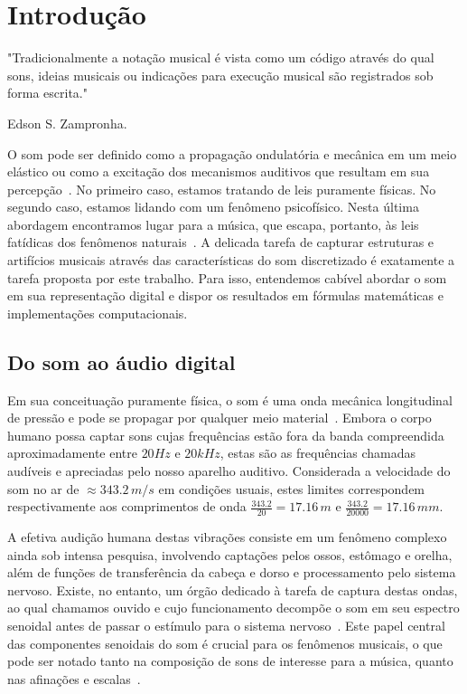 \chapter{Introdução} %
\label{cap:intro} 
\epigraph{"Tradicionalmente a notação musical é vista como um código através do qual sons, ideias musicais ou indicações para execução musical são registrados sob forma escrita."}{Edson S. Zampronha.\cite{Zampronha} \\}


O som pode ser definido como a propagação ondulatória e mecânica em um meio elástico
ou como a excitação dos mecanismos auditivos que resultam em sua percepção~\cite{Everest}. No primeiro
caso, estamos tratando de leis puramente físicas. No segundo caso, estamos lidando com um
fenômeno psicofísico. Nesta última abordagem encontramos lugar para a música, que escapa,
portanto, às leis fatídicas dos fenômenos naturais~\cite{Roederer}. A delicada tarefa de capturar estruturas
e artifícios musicais através das características do som discretizado
é exatamente a tarefa proposta por este trabalho. Para isso, entendemos cabível
abordar o som em sua representação digital e dispor os resultados em fórmulas matemáticas e implementações computacionais. 


    \section{Do som ao áudio digital}\label{sec:audio}

Em sua conceituação puramente física, o som é uma onda mecânica longitudinal de pressão e pode se propagar por qualquer meio material~\cite{}.
Embora o corpo humano possa captar sons cujas frequências estão fora da banda compreendida aproximadamente entre $20Hz$ e $20 kHz$, estas são as frequências chamadas audíveis e apreciadas pelo nosso aparelho auditivo.
 Considerada a velocidade do som no ar de $\approx 343.2\,m/s$ em condições usuais,
estes limites correspondem respectivamente aos comprimentos de onda $\frac{343.2}{20} = 17.16\,m$ e $\frac{343.2}{20000}=17.16\,mm$.

A efetiva audição humana destas vibrações consiste em um fenômeno complexo ainda sob intensa pesquisa, involvendo captações pelos ossos, estômago e orelha, além de funções de transferência da cabeça e dorso e processamento pelo sistema nervoso. Existe, no entanto, um órgão dedicado à tarefa de captura destas ondas, ao qual chamamos ouvido e cujo funcionamento decompõe o som em seu espectro senoidal antes de passar o estímulo para o sistema nervoso~\cite{Roederer}. Este papel central das componentes senoidais do som é crucial para os fenômenos musicais, o que pode ser notado tanto na composição de sons de interesse para a música, quanto nas afinações e escalas~\cite{floEsp}.

